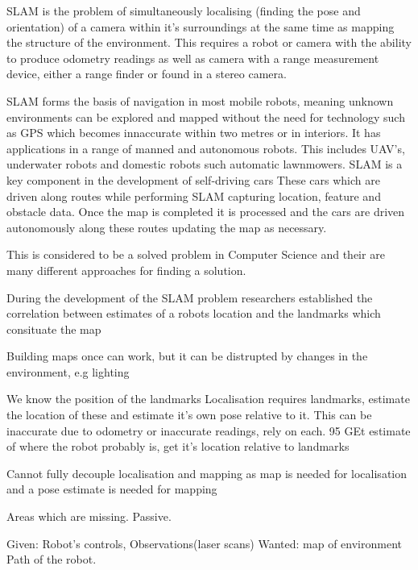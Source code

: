 \documentclass{mproj}
\begin{document}
SLAM is the problem of simultaneously localising (finding the pose and orientation) of a camera within it's surroundings at the same time as mapping the structure of the environment. This requires a robot or camera with the ability to produce odometry readings as well as camera with a range measurement device, either a range finder or found in a stereo camera. 

SLAM forms the basis of navigation in most mobile robots, meaning unknown environments can be explored and mapped without the need for technology such as GPS which becomes innaccurate within two metres or in interiors. It has applications in a range of manned and autonomous robots. This includes UAV's, underwater robots and domestic robots such automatic lawnmowers. SLAM is a key component in the development of self-driving cars These cars which are driven along routes while performing SLAM capturing location, feature and obstacle data. Once the map is completed it is processed and the cars are driven autonomously along these routes updating the map as necessary.



This is considered to be a solved problem in Computer Science and their are many different approaches for finding a solution. \cite{Hugh2006}



During the development of the SLAM problem researchers established the correlation between estimates of a robots location and the landmarks which consituate the map







Building maps once can work, but it can be distrupted by changes in the environment, e.g lighting 

We know the position of the landmarks
Localisation requires landmarks, estimate the location of these and estimate it's own pose relative to it. This can be inaccurate due to odometry or inaccurate readings, rely on each. 95%
GEt estimate of where the robot probably is, get it's location relative to landmarks

Cannot fully decouple localisation and mapping as map is needed for localisation and a pose estimate is needed for mapping

Areas which are missing. Passive.

Given: Robot's controls, Observations(laser scans)
Wanted: map of environment
Path of the robot.
\end{document}
